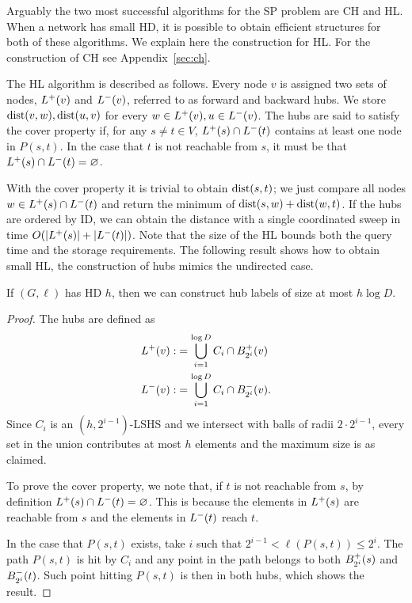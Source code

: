 Arguably the two most successful algorithms for the SP problem are CH and HL.
When a network has small HD, it is possible to obtain efficient structures for both of these algorithms.
We explain here the construction for HL.
For the construction of CH see Appendix~\ref{sec:ch}.

The HL algorithm is described as follows.
Every node $v$ is assigned two sets of nodes, $L^+(v)$ and $L^-(v)$, referred to as forward and backward hubs.
We store $\text{dist}(v,w),\text{dist}(u,v)$ for every $w\in L^+(v),u\in L^-(v)$.
The hubs are said to satisfy the cover property if, for any $s\neq t\in V$, $L^+(s)\cap L^-(t)$ contains at least one node in $P(s,t)$.
In the case that $t$ is not reachable from $s$, it must be that $L^+(s)\cap L^-(t)=\varnothing$.

With the cover property it is trivial to obtain $\text{dist}(s,t)$; we just compare all nodes $w\in L^+(s)\cap L^-(t)$ and return the minimum of $\text{dist}(s,w)+\text{dist}(w,t)$.
If the hubs are ordered by ID, we can obtain the distance with a single coordinated sweep in time $O(\lvert L^+(s)\rvert+\lvert L^-(t)\rvert)$.
Note that the size of the HL bounds both the query time and the storage requirements.
The following result shows how to obtain small HL, the construction of hubs mimics the undirected case.

\begin{theorem}\label{theo:construct_hl}
If $(G,\ell)$ has HD $h$, then we can construct hub labels of size at most $h\log D$.
\end{theorem}
\begin{proof}
The hubs are defined as
\begin{align*}
L^+(v):&=  \bigcup_{i=1}^{\log D}C_i\cap B^+_{2^i}(v)\\
L^-(v):&= \bigcup_{i=1}^{\log D}C_i\cap B^-_{2^i}(v).
\end{align*}
Since $C_i$ is an $(h,2^{i-1})$-LSHS and we intersect with balls of radii $2\cdot 2^{i-1}$, every set in the union contributes at most $h$ elements and the maximum size is as claimed.

To prove the cover property, we note that, if $t$ is not reachable from $s$, by definition $L^+(s)\cap L^-(t)=\varnothing$.
This is because the elements in $L^+(s)$ are reachable from $s$ and the elements in $L^-(t)$ reach $t$.

In the case that $P(s,t)$ exists, take $i$ such that $2^{i-1}<\ell(P(s,t))\leq 2^i$.
The path $P(s,t)$ is hit by $C_i$ and any point in the path belongs to both $B^+_{2^i}(s)$ and $B^-_{2^i}(t)$.
Such point hitting $P(s,t)$ is then in both hubs, which shows the result.
\end{proof}

